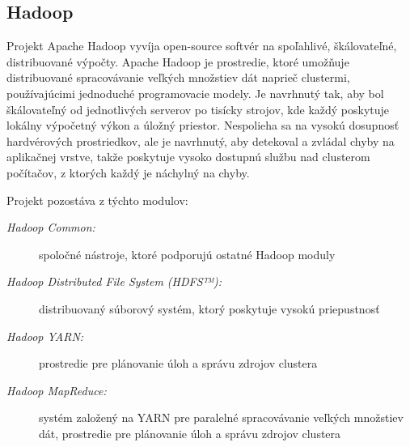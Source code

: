 \documentclass[11pt,final,oneside]{fithesis}
\begin{document}
\subsection{Hadoop}
Projekt Apache Hadoop vyvíja open-source softvér na spoľahlivé, škálovateľné, distribuované výpočty. Apache Hadoop je prostredie, ktoré umožňuje distribuované spracovávanie veľkých množstiev dát
naprieč clustermi, používajúcimi jednoduché programovacie modely. Je navrhnutý tak, aby bol škálovateľný od jednotlivých serverov po tisícky strojov, kde každý poskytuje lokálny výpočetný výkon a úložný priestor.
Nespolieha sa na vysokú dosupnosť hardvérových prostriedkov, ale je navrhnutý, aby detekoval a zvládal chyby na aplikačnej vrstve, takže poskytuje vysoko dostupnú službu nad clusterom počítačov, 
z ktorých každý je náchylný na chyby.

Projekt pozostáva z týchto modulov:
\begin{description}
\item[\emph{Hadoop Common:}] spoločné nástroje, ktoré podporujú ostatné Hadoop moduly
\item[\emph{Hadoop Distributed File System (HDFS™):}] distribuovaný súborový systém, ktorý poskytuje vysokú priepustnosť
\item[\emph{Hadoop YARN:}] prostredie pre plánovanie úloh a správu zdrojov clustera
\item[\emph{Hadoop MapReduce:}] systém založený na YARN pre paralelné spracovávanie veľkých množstiev dát, prostredie pre plánovanie úloh a správu zdrojov clustera
\end{description}
\end{document}

